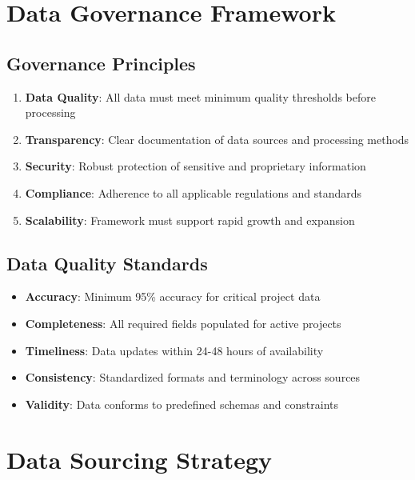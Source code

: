 \documentclass[business]{../templates/infraradar-main}
\begin{document}
\section{Data Governance Framework}

\subsection{Governance Principles}
\begin{enumerate}
    \item \textbf{Data Quality}: All data must meet minimum quality thresholds before processing
    \item \textbf{Transparency}: Clear documentation of data sources and processing methods
    \item \textbf{Security}: Robust protection of sensitive and proprietary information
    \item \textbf{Compliance}: Adherence to all applicable regulations and standards
    \item \textbf{Scalability}: Framework must support rapid growth and expansion
\end{enumerate}

\subsection{Data Quality Standards}
\begin{itemize}
    \item \textbf{Accuracy}: Minimum 95\% accuracy for critical project data
    \item \textbf{Completeness}: All required fields populated for active projects
    \item \textbf{Timeliness}: Data updates within 24-48 hours of availability
    \item \textbf{Consistency}: Standardized formats and terminology across sources
    \item \textbf{Validity}: Data conforms to predefined schemas and constraints
\end{itemize}

\section{Data Sourcing Strategy}
\end{document}
